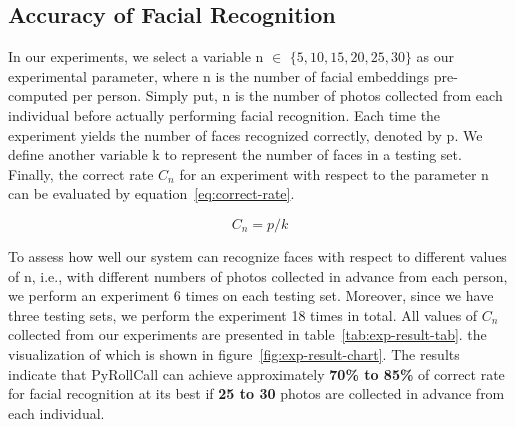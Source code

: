 
\subsection{Accuracy of Facial Recognition}
In our experiments, we select a variable n $\in$ $\{5, 10, 15, 20, 25, 30\}$ as our experimental parameter,
where n is the number of facial embeddings pre-computed per person. Simply put, n is the
number of photos collected from each individual before actually performing facial recognition.
Each time the experiment yields the number of faces recognized correctly, denoted by p.
We define another variable k to represent the number of faces in a testing set.
Finally, the correct rate $C_n$  for an experiment with respect to the parameter n can be evaluated by equation~\ref{eq:correct-rate}.

\begin{equation}
  \label{eq:correct-rate}
  C_n = p / k
\end{equation}

To assess how well our system can recognize faces with respect to different values of n,
i.e., with different numbers of photos collected in advance from each person, we perform an experiment
6 times on each testing set. Moreover, since we have three testing sets, we perform the experiment
18 times in total. All values of $C_n$ collected from our experiments are presented in table~\ref{tab:exp-result-tab}.
the visualization of which is shown in figure~\ref{fig:exp-result-chart}.
The results indicate that PyRollCall can achieve approximately \textbf{70\% to 85\%} of correct rate
for facial recognition at its best if \textbf{25 to 30} photos are collected in advance from each individual.
\vspace{0.5cm}


